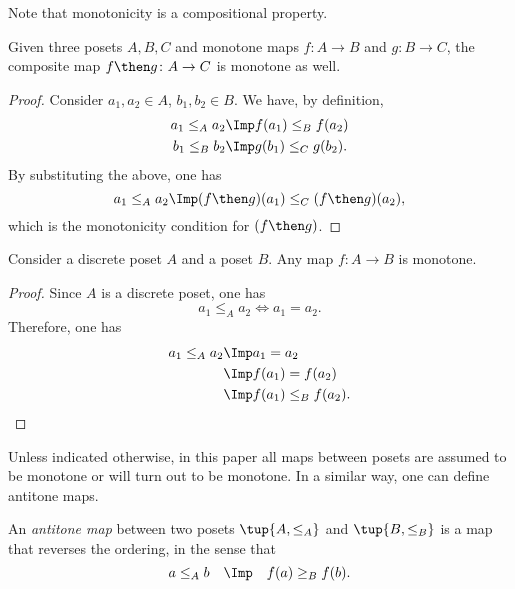 \noindent Note that monotonicity is a compositional property.

\begin{lemma}Given three posets $A, B, C$ and monotone maps $f\colon A
\to B$ and  $g\colon B \to C$, the composite map $f\then g\colon  A \to C$ is
monotone as well.
\end{lemma}
\begin{proof}
Consider $a_1,a_2 \in A$, $b_1,b_2\in B$. We have, by definition, 
\begin{equation}
\begin{aligned}
        a_1\leq_A a_2 &\Imp f(a_1)\leq_B f(a_2)\\ 
        b_1\leq_B b_2 &\Imp g(b_1)\leq_C g(b_2).
\end{aligned}
\end{equation}
By substituting the above, one has
\begin{equation}
    a_1\leq_A a_2 \Imp (f\then g)(a_1) \leq_C (f\then g)(a_2),
\end{equation}
which is the monotonicity condition for $(f\then g)$.
\end{proof}

\begin{lemma}
Consider a discrete poset $A$ and a poset $B$. Any map $f\colon A\to B$ is monotone.
\end{lemma}
\begin{proof}
Since $A$ is a discrete poset, one has
\begin{equation}
    a_1\leq_A a_2 \iff a_1=a_2.
\end{equation}
Therefore, one has
\begin{equation}
\begin{aligned}
    a_1\leq_A a_2 &\Imp a_1=a_2\\
    &\Imp f(a_1)=f(a_2)\\
    &\Imp f(a_1)\leq_B f(a_2).
\end{aligned}
\end{equation}
\end{proof}
Unless indicated otherwise, in this paper all maps between posets
are assumed to be monotone or will turn out to be monotone. In a similar way, one can define antitone maps.
\begin{definition}
An \emph{antitone map} between two posets
$\tup{A, \leq_A}$ and $\tup{B, \leq_B}$ is a map that reverses the ordering, in the sense that 
\begin{equation}
 a \leq_A b \quad \Imp \quad f(a) \geq_B f(b).
\end{equation}
\end{definition}

